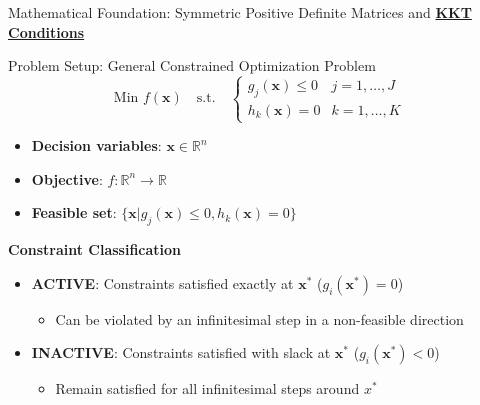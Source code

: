 \documentclass{beamer}
\begin{document}
\begin{frame}{{Mathematical Foundation: Symmetric Positive Definite Matrices and \textbf{\underline{KKT Conditions}}}}
    \begin{block}{Problem Setup: General Constrained Optimization Problem}
        \[
            \text{Min } f(\bm{x}) \quad \text{s.t.} \quad
            \begin{cases}
                g_j(\bm{x}) \leq 0 & j = 1,\ldots,J \\
                h_k(\bm{x}) = 0 & k = 1,\ldots,K
            \end{cases}
        \]

        \begin{itemize}
            \item \textbf{Decision variables}: $\bm{x} \in \mathbb{R}^n$
            \item \textbf{Objective}: $f: \mathbb{R}^n \rightarrow \mathbb{R}$
            \item \textbf{Feasible set}: $\{\bm{x} | g_j(\bm{x}) \leq 0, h_k(\bm{x}) = 0\}$
        \end{itemize}
    \end{block}

    \textbf{Constraint Classification}
    \begin{itemize}
    \item \textbf{ACTIVE}: Constraints satisfied exactly at $\mathbf{x^*}$ ($g_i(\mathbf{x^*}) = 0$)
    \begin{itemize}
        \item Can be violated by an infinitesimal step in a non-feasible direction
    \end{itemize}
    
    \item \textbf{INACTIVE}: Constraints satisfied with slack at $\mathbf{x^*}$ ($g_i(\mathbf{x^*}) < 0$)
    \begin{itemize}
        \item Remain satisfied for all infinitesimal steps around $x^*$
    \end{itemize}
\end{itemize}
\end{frame}
\end{document}
